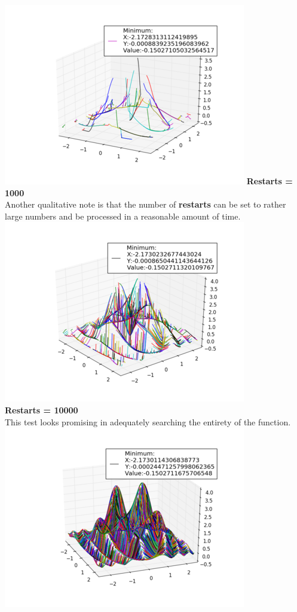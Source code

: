 \documentclass[]{report}
\begin{document}
	\includegraphics{hcr100}\newpage
	\textbf{Restarts = 1000}\\
	Another qualitative note is that the number of \textbf{restarts} can be set to rather large numbers and be processed in a reasonable amount of time.\\
	\includegraphics{hcr1000}\\
	\textbf{Restarts = 10000}\\
	This test looks promising in adequately searching the entirety of the function.\\
	\includegraphics{hcr10000}
\end{document}
